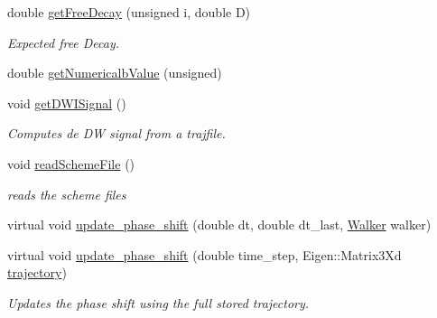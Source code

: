 \begin{DoxyCompactItemize}
\mbox{\label{class_p_g_s_e_sequence_a375c8a943f4857a323ffc404394b5d8a}} 
double \hyperlink{class_p_g_s_e_sequence_a375c8a943f4857a323ffc404394b5d8a}{get\+Free\+Decay} (unsigned i, double D)
\begin{DoxyCompactList}\small\item\em Expected free Decay. \end{DoxyCompactList}\item 
double \hyperlink{class_p_g_s_e_sequence_a1373f02bffedb1e934818ae8d4fb8939}{get\+Numericalb\+Value} (unsigned)
\item 
\mbox{\label{class_p_g_s_e_sequence_aec05e76b5c7b3361bd3e68301b262a0a}} 
void \hyperlink{class_p_g_s_e_sequence_aec05e76b5c7b3361bd3e68301b262a0a}{get\+D\+W\+I\+Signal} ()
\begin{DoxyCompactList}\small\item\em Computes de DW signal from a trajfile. \end{DoxyCompactList}\item 
\mbox{\label{class_p_g_s_e_sequence_a22005e67e3513690f9e46b1d531481b0}} 
void \hyperlink{class_p_g_s_e_sequence_a22005e67e3513690f9e46b1d531481b0}{read\+Scheme\+File} ()
\begin{DoxyCompactList}\small\item\em reads the scheme files \end{DoxyCompactList}\item 
virtual void \hyperlink{class_p_g_s_e_sequence_a6914efd208eab28a1ee6a3f28ca65478}{update\+\_\+phase\+\_\+shift} (double dt, double dt\+\_\+last, \hyperlink{class_walker}{Walker} walker)
\item 
\mbox{\label{class_p_g_s_e_sequence_a850a2f22cdf8b420888cfa906e03e078}} 
virtual void \hyperlink{class_p_g_s_e_sequence_a850a2f22cdf8b420888cfa906e03e078}{update\+\_\+phase\+\_\+shift} (double time\+\_\+step, Eigen\+::\+Matrix3\+Xd \hyperlink{class_p_g_s_e_sequence_a0fd0fb458384bfb65070fdab5165dde5}{trajectory})
\begin{DoxyCompactList}\small\item\em Updates the phase shift using the full stored trajectory. \end{DoxyCompactList}\item 
\mbox{\label{class_p_g_s_e_sequence_ae2b79f12ccd2f2446a498cb51f45e88d}} 

\end{DoxyCompactItemize}
